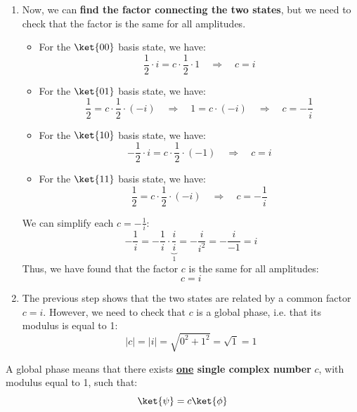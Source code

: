 \begin{enumerate}
    \item Now, we can \textbf{find the factor connecting the two states}, but we need to check that the factor is the same for all amplitudes.
    \begin{itemize}
        \item For the $\ket{00}$ basis state, we have:
        \begin{equation*}
            \frac{1}{2} \cdot i = c \cdot \frac{1}{2} \cdot 1 \quad \Rightarrow \quad c = i
        \end{equation*}
        \item For the $\ket{01}$ basis state, we have:
        \begin{equation*}
                \frac{1}{2} = c \cdot \frac{1}{2} \cdot (-i) \quad \Rightarrow \quad 1 = c \cdot (-i) \quad \Rightarrow \quad c = -\frac{1}{i}
        \end{equation*}
        \item For the $\ket{10}$ basis state, we have:
        \begin{equation*}
            -\frac{1}{2} \cdot i = c \cdot \frac{1}{2} \cdot (-1) \quad \Rightarrow \quad c = i
        \end{equation*}
        \item For the $\ket{11}$ basis state, we have:
        \begin{equation*}
            \frac{1}{2} = c \cdot \frac{1}{2} \cdot (-i) \quad \Rightarrow \quad c = -\frac{1}{i}
        \end{equation*}
    \end{itemize}
    We can simplify each $c = -\frac{1}{i}$:
    \begin{equation*}
        -\frac{1}{i} = -\frac{1}{i} \cdot \underbrace{\frac{i}{i}}_{1} = -\frac{i}{i^2} = -\frac{i}{-1} = i
    \end{equation*}
    Thus, we have found that the factor $c$ is the same for all amplitudes:
    \begin{equation*}
        c = i
    \end{equation*}
    

    \item The previous step shows that the two states are related by a common factor $c = i$. However, we need to check that $c$ is a global phase, i.e. that its modulus is equal to 1:
    \begin{equation*}
        \left|c\right| = \left|i\right| = \sqrt{0^2 + 1^2} = \sqrt{1} = 1
    \end{equation*}
\end{enumerate}
A global phase means that there exists \textbf{\underline{one} single complex number} $c$, with modulus equal to 1, such that:
\begin{equation*}
    \ket{\psi} = c \ket{\phi}
\end{equation*}
